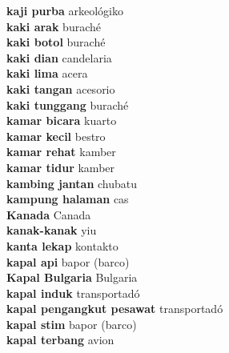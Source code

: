 \textbf{ kaji purba  } arkeológiko \\
\textbf{ kaki arak  } buraché \\
\textbf{ kaki botol  } buraché \\
\textbf{ kaki dian  } candelaria \\
\textbf{ kaki lima  } acera \\
\textbf{ kaki tangan  } acesorio \\
\textbf{ kaki tunggang  } buraché \\
\textbf{ kamar bicara  } kuarto \\
\textbf{ kamar kecil  } bestro \\
\textbf{ kamar rehat  } kamber \\
\textbf{ kamar tidur  } kamber \\
\textbf{ kambing jantan  } chubatu \\
\textbf{ kampung halaman  } cas \\
\textbf{ Kanada  } Canada \\
\textbf{ kanak-kanak  } yiu \\
\textbf{ kanta lekap  } kontakto \\
\textbf{ kapal api  } bapor (barco) \\
\textbf{ Kapal Bulgaria  } Bulgaria \\
\textbf{ kapal induk  } transportadó \\
\textbf{ kapal pengangkut pesawat  } transportadó \\
\textbf{ kapal stim  } bapor (barco) \\
\textbf{ kapal terbang  } avion \\
